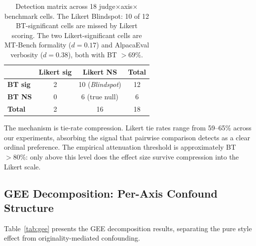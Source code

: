 \documentclass[11pt]{article}
\begin{document}
\begin{table}[t]
\centering
\small
\begin{tabular}{lcc|c}
\toprule
 & \textbf{Likert sig} & \textbf{Likert NS} & \textbf{Total} \\
\midrule
\textbf{BT sig}  & 2 & 10 (\emph{Blindspot}) & 12 \\
\textbf{BT NS}   & 0 & 6 (true null) & 6 \\
\midrule
\textbf{Total}    & 2 & 16 & 18 \\
\bottomrule
\end{tabular}
\caption{Detection matrix across 18 judge$\times$axis$\times$benchmark cells. The Likert Blindspot: 10 of 12 BT-significant cells are missed by Likert scoring. The two Likert-significant cells are MT-Bench formality ($d = 0.17$) and AlpacaEval verbosity ($d = 0.38$), both with BT $> 69\%$.}
\label{tab:blindspot}
\end{table}

The mechanism is tie-rate compression.
Likert tie rates range from 59--65\% across our experiments, absorbing the signal that pairwise comparison detects as a clear ordinal preference.
The empirical attenuation threshold is approximately BT $> 80\%$: only above this level does the effect size survive compression into the Likert scale.

\subsection{GEE Decomposition: Per-Axis Confound Structure}
\label{sec:gee}

Table~\ref{tab:gee} presents the GEE decomposition results, separating the pure style effect from originality-mediated confounding.
\end{document}
